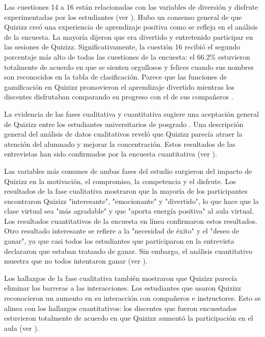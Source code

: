 \documentclass[spanish]{textolivre}
\begin{document}
Las cuestiones 14 a 16 están relacionadas con las variables de diversión y disfrute experimentadas por los estudiantes (ver ). Hubo un consenso general de que Quizizz creó una experiencia de aprendizaje positiva como se refleja en el análisis de la encuesta. La mayoría dijeron que era divertido y entretenido participar en las sesiones de Quizizz. Significativamente, la cuestión 16 recibió el segundo porcentaje más alto de todas las cuestiones de la encuesta: el 66.2\% estuvieron totalmente de acuerdo en que se sienten orgullosos y felices cuando sus nombres son reconocidos en la tabla de clasificación. Parece que las funciones de gamificación en Quizizz promovieron el aprendizaje divertido mientras los discentes disfrutaban comparando su progreso con el de sus compañeros \cite{ismail2019, ryan2000, wang2015}.

La evidencia de las fases cualitativa y cuantitativa sugiere una aceptación general de Quizizz entre los estudiantes universitarios de posgrado \cite{bottentuit2020, licorish2018, wang2015}. Una descripción general del análisis de datos cualitativos reveló que Quizizz parecía atraer la atención del alumnado y mejorar la concentración. Estos resultados de las entrevistas han sido confirmados por la encuesta cuantitativa (ver ).

Las variables más comunes de ambas fases del estudio surgieron del impacto de Quizizz en la motivación, el compromiso, la competencia y el disfrute. Los resultados de la fase cualitativa mostraron que la mayoría de los participantes encontraron Quizizz "interesante", "emocionante" y "divertido", lo que hace que la clase virtual sea "más agradable" y que "aporta energía positiva" al aula virtual. Los resultados cuantitativos de la encuesta en línea confirmaron estos resultados. Otro resultado interesante se refiere a la "necesidad de éxito" y el "deseo de ganar", ya que casi todos los estudiantes que participaron en la entrevista declararon que estaban tratando de ganar. Sin embargo, el análisis cuantitativo muestra que no todos intentaron ganar (ver ).

Los hallazgos de la fase cualitativa también mostraron que Quizizz parecía eliminar las barreras a las interacciones. Los estudiantes que usaron Quizizz reconocieron un aumento en su interacción con compañeros e instructores. Esto se alinea con los hallazgos cuantitativos: los discentes que fueron encuestados estuvieron totalmente de acuerdo en que Quizizz aumentó la participación en el aula (ver ).
\end{document}
